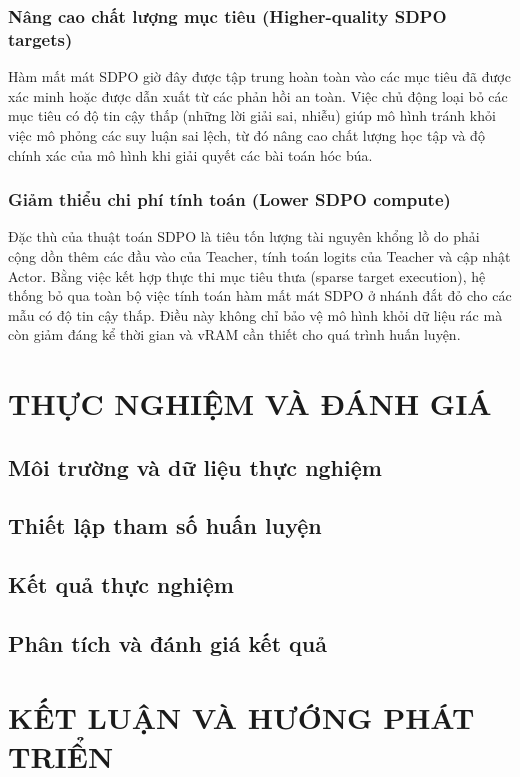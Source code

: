 \documentclass[12pt,a4paper]{report}
\begin{document}
\subsection{Nâng cao chất lượng mục tiêu (Higher-quality SDPO targets)}
Hàm mất mát SDPO giờ đây được tập trung hoàn toàn vào các mục tiêu đã được xác minh hoặc được dẫn xuất từ các phản hồi an toàn. Việc chủ động loại bỏ các mục tiêu có độ tin cậy thấp (những lời giải sai, nhiễu) giúp mô hình tránh khỏi việc mô phỏng các suy luận sai lệch, từ đó nâng cao chất lượng học tập và độ chính xác của mô hình khi giải quyết các bài toán hóc búa.

\subsection{Giảm thiểu chi phí tính toán (Lower SDPO compute)}
Đặc thù của thuật toán SDPO là tiêu tốn lượng tài nguyên khổng lồ do phải cộng dồn thêm các đầu vào của Teacher, tính toán logits của Teacher và cập nhật Actor. Bằng việc kết hợp thực thi mục tiêu thưa (sparse target execution), hệ thống bỏ qua toàn bộ việc tính toán hàm mất mát SDPO ở nhánh đắt đỏ cho các mẫu có độ tin cậy thấp. Điều này không chỉ bảo vệ mô hình khỏi dữ liệu rác mà còn giảm đáng kể thời gian và vRAM cần thiết cho quá trình huấn luyện.

\chapter{THỰC NGHIỆM VÀ ĐÁNH GIÁ}
\section{Môi trường và dữ liệu thực nghiệm}
\section{Thiết lập tham số huấn luyện}
\section{Kết quả thực nghiệm}
\section{Phân tích và đánh giá kết quả}

\chapter{KẾT LUẬN VÀ HƯỚNG PHÁT TRIỂN}
\end{document}
